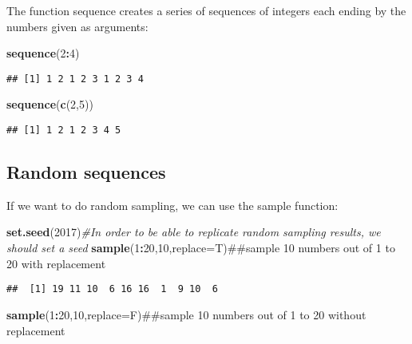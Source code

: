 \documentclass[]{book}
\newenvironment{Shaded}{\begin{snugshade}}{\end{snugshade}}
\newcommand{\KeywordTok}[1]{\textcolor[rgb]{0.13,0.29,0.53}{\textbf{#1}}}
\newcommand{\DataTypeTok}[1]{\textcolor[rgb]{0.13,0.29,0.53}{#1}}
\newcommand{\DecValTok}[1]{\textcolor[rgb]{0.00,0.00,0.81}{#1}}
\newcommand{\CommentTok}[1]{\textcolor[rgb]{0.56,0.35,0.01}{\textit{#1}}}
\newcommand{\OperatorTok}[1]{\textcolor[rgb]{0.81,0.36,0.00}{\textbf{#1}}}
\newcommand{\NormalTok}[1]{#1}
\theoremstyle{definition}
\theoremstyle{definition}
\theoremstyle{definition}
\theoremstyle{remark}
\begin{document}
The function sequence creates a series of sequences of integers each
ending by the numbers given as arguments:

\begin{Shaded}
\begin{Highlighting}[]
\KeywordTok{sequence}\NormalTok{(}\DecValTok{2}\OperatorTok{:}\DecValTok{4}\NormalTok{)}
\end{Highlighting}
\end{Shaded}

\begin{verbatim}
## [1] 1 2 1 2 3 1 2 3 4
\end{verbatim}

\begin{Shaded}
\begin{Highlighting}[]
\KeywordTok{sequence}\NormalTok{(}\KeywordTok{c}\NormalTok{(}\DecValTok{2}\NormalTok{,}\DecValTok{5}\NormalTok{))}
\end{Highlighting}
\end{Shaded}

\begin{verbatim}
## [1] 1 2 1 2 3 4 5
\end{verbatim}

\subsection{Random sequences}\label{random-sequences}

If we want to do random sampling, we can use the sample function:

\begin{Shaded}
\begin{Highlighting}[]
\KeywordTok{set.seed}\NormalTok{(}\DecValTok{2017}\NormalTok{)}\CommentTok{#In order to be able to replicate random sampling results, we should set a seed}
\KeywordTok{sample}\NormalTok{(}\DecValTok{1}\OperatorTok{:}\DecValTok{20}\NormalTok{,}\DecValTok{10}\NormalTok{,}\DataTypeTok{replace=}\NormalTok{T)##sample 10 numbers out of 1 to 20 with replacement}
\end{Highlighting}
\end{Shaded}

\begin{verbatim}
##  [1] 19 11 10  6 16 16  1  9 10  6
\end{verbatim}

\begin{Shaded}
\begin{Highlighting}[]
\KeywordTok{sample}\NormalTok{(}\DecValTok{1}\OperatorTok{:}\DecValTok{20}\NormalTok{,}\DecValTok{10}\NormalTok{,}\DataTypeTok{replace=}\NormalTok{F)##sample 10 numbers out of 1 to 20 without replacement}
\end{Highlighting}
\end{Shaded}
\end{document}
